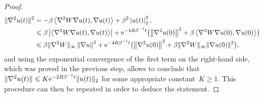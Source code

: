 \documentclass[11pt,a4paper]{article}
\newcommand{\e}{\mathrm{e}}
\newcommand{\grad}{\nabla}
\newcommand{\hess}{\nabla^2}
\theoremstyle{plain}
\newtheorem{remark}{Remark}[section]
\numberwithin{equation}{section}
\renewcommand{\leq}{\leqslant}
\renewcommand{\geq}{\geqslant}
\begin{document}
\begin{proof}
    \begin{align*}
        \norm*{\hess u(t)}^2
        &= - \beta \ip{\hess W \grad u(t)}{\grad u(t)} + \beta^2 \seminorm{u(t)}[2]^2, \\
        &\leq \beta \abs{\ip{\hess W \grad u(t)}{\grad u(t)}} + \e^{-4R \beta^{-1}t} \bigl( \norm{\grad^2 u(0)}^2 + \beta \ip{\grad^2 W \grad u(0)}{\grad u(0)} \bigr) \\
        &\leq \beta \norm*{\grad^2 W}_{\infty} \norm{\grad u}^2 + \e^{-4R \beta^{-1}t} \bigl( \norm{\grad^2 u(0)}^2 + \beta \norm*{\grad^2 W}_{\infty} \norm*{\grad u(0)}^2 \bigr),
    \end{align*}
    and using the exponential convergence of the first term on the right-hand side,
    which was proved in the previous step,
    allows to conclude that $\norm*{\grad^2 u(t)} \leq K \e^{-2 R \beta^{-1} t} \norm*{u(t)}[2]$ for some appropriate constant~$K \geq 1$.
    This procedure can then be repeated in order to deduce the statement.
\end{proof}

\end{document}
